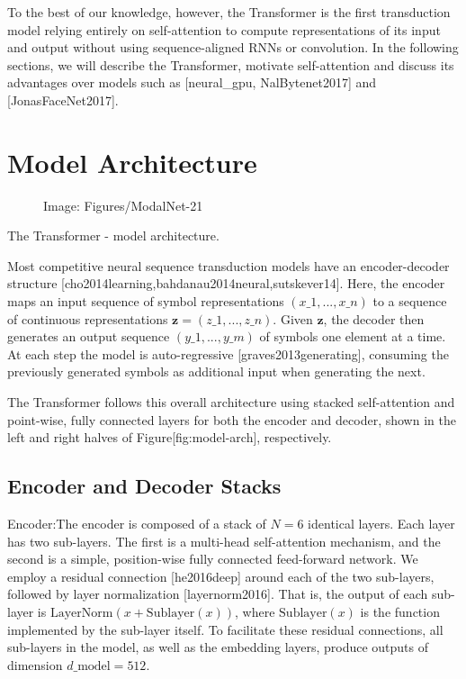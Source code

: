 \documentclass[11pt,a4paper]{article}
\begin{document}
To the best of our knowledge, however, the Transformer is the first transduction model relying entirely on self-attention to compute representations of its input and output without using sequence-aligned RNNs or convolution.
In the following sections, we will describe the Transformer, motivate self-attention and discuss its advantages over models such as [neural\_gpu, NalBytenet2017] and [JonasFaceNet2017].

\section{Model Architecture}

\begin{figure}[h]
\caption{Image: Figures/ModalNet-21}
\end{figure}

The Transformer - model architecture.

Most competitive neural sequence transduction models have an encoder-decoder structure [cho2014learning,bahdanau2014neural,sutskever14]. Here, the encoder maps an input sequence of symbol representations $(x\_1, ..., x\_n)$ to a sequence of continuous representations $\mathbf{z} = (z\_1, ..., z\_n)$. Given $\mathbf{z}$, the decoder then generates an output sequence $(y\_1,...,y\_m)$ of symbols one element at a time. At each step the model is auto-regressive [graves2013generating], consuming the previously generated symbols as additional input when generating the next.

The Transformer follows this overall architecture using stacked self-attention and point-wise, fully connected layers for both the encoder and decoder, shown in the left and right halves of Figure[fig:model-arch], respectively.

\subsection{Encoder and Decoder Stacks}

Encoder:The encoder is composed of a stack of $N=6$ identical layers. Each layer has two sub-layers. The first is a multi-head self-attention mechanism, and the second is a simple, position-wise fully connected feed-forward network.   We employ a residual connection [he2016deep] around each of the two sub-layers, followed by layer normalization [layernorm2016].  That is, the output of each sub-layer is $\mathrm{LayerNorm}(x + \mathrm{Sublayer}(x))$, where $\mathrm{Sublayer}(x)$ is the function implemented by the sub-layer itself.  To facilitate these residual connections, all sub-layers in the model, as well as the embedding layers, produce outputs of dimension $d\_{\text{model}}=512$.
\end{document}
